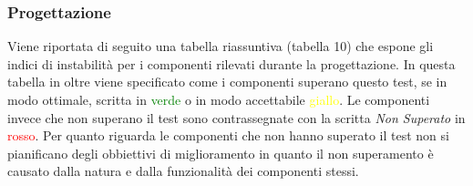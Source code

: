 		\subsubsection{Progettazione}
		Viene riportata di seguito una tabella riassuntiva (tabella 10) che espone gli indici di instabilità per i componenti rilevati durante la progettazione. In questa tabella in oltre viene specificato come i componenti superano questo test, se in modo ottimale, scritta in \textcolor{green}{verde} o in modo accettabile \textcolor{yellow}{giallo}. Le componenti invece che non superano il test sono contrassegnate con la scritta \textit{Non Superato} in \textcolor{red}{rosso}. Per quanto riguarda le componenti che non hanno superato il test non si pianificano degli obbiettivi di miglioramento in quanto il non superamento è causato dalla natura e dalla funzionalità dei componenti stessi.
